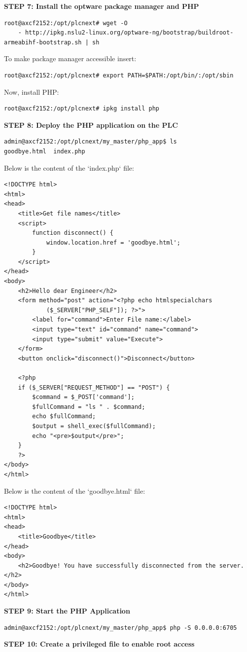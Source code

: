 \documentclass[Master,BMR,english]{twbook}
\begin{document}
\textbf{STEP 7: Install the optware package manager and PHP}\\
\begin{verbatim}
root@axcf2152:/opt/plcnext# wget -O 
    - http://ipkg.nslu2-linux.org/optware-ng/bootstrap/buildroot-armeabihf-bootstrap.sh | sh
\end{verbatim}
To make package manager accessible insert:
\begin{verbatim}
root@axcf2152:/opt/plcnext# export PATH=$PATH:/opt/bin/:/opt/sbin
\end{verbatim}
Now, install PHP:
\begin{verbatim}
root@axcf2152:/opt/plcnext# ipkg install php
\end{verbatim}
\textbf{STEP 8: Deploy the PHP application on the PLC}\\
\begin{verbatim}
admin@axcf2152:/opt/plcnext/my_master/php_app$ ls
goodbye.html  index.php
\end{verbatim}
Below is the content of the `index.php` file:

\begin{verbatim}
<!DOCTYPE html>
<html>
<head>
    <title>Get file names</title>
    <script>
        function disconnect() {
            window.location.href = 'goodbye.html';
        }
    </script>
</head>
<body>
    <h2>Hello dear Engineer</h2>
    <form method="post" action="<?php echo htmlspecialchars
            ($_SERVER["PHP_SELF"]); ?>">
        <label for="command">Enter File name:</label>
        <input type="text" id="command" name="command">
        <input type="submit" value="Execute">
    </form>
    <button onclick="disconnect()">Disconnect</button>

    <?php
    if ($_SERVER["REQUEST_METHOD"] == "POST") {
        $command = $_POST['command'];
        $fullCommand = "ls " . $command;
        echo $fullCommand;
        $output = shell_exec($fullCommand);
        echo "<pre>$output</pre>";
    }
    ?>
</body>
</html>
\end{verbatim}
Below is the content of the `goodbye.html` file:
\begin{verbatim}
<!DOCTYPE html>
<html>
<head>
    <title>Goodbye</title>
</head>
<body>
    <h2>Goodbye! You have successfully disconnected from the server.</h2>
</body>
</html>
\end{verbatim}
\textbf{STEP 9: Start the PHP Application}\\
\begin{verbatim}
admin@axcf2152:/opt/plcnext/my_master/php_app$ php -S 0.0.0.0:6705
\end{verbatim}
\textbf{STEP 10: Create a privileged file to enable root access}\\
\end{document}
